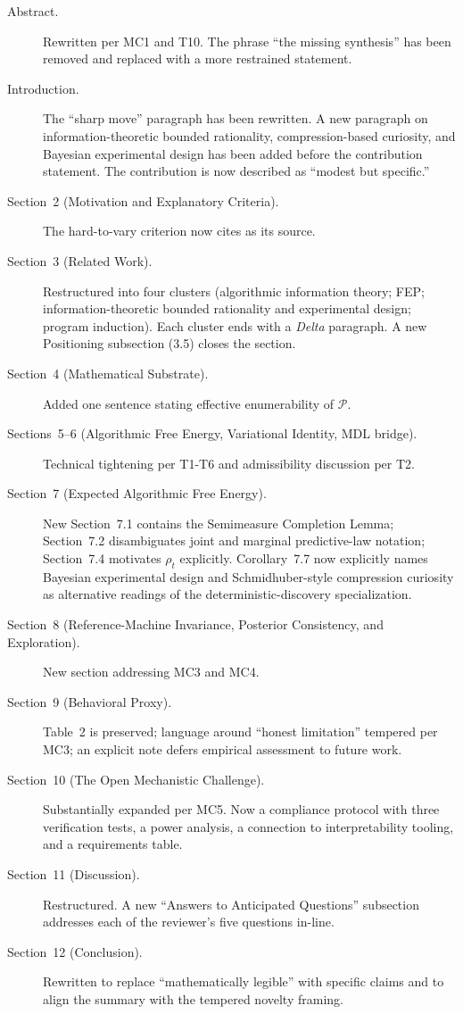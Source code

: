 \documentclass[11pt]{article}
\begin{document}
\begin{description}
\item[Abstract.] Rewritten per MC1 and T10. The phrase ``the missing synthesis'' has been removed and replaced with a more restrained statement.
\item[Introduction.] The ``sharp move'' paragraph has been rewritten. A new paragraph on information-theoretic bounded rationality, compression-based curiosity, and Bayesian experimental design has been added before the contribution statement. The contribution is now described as ``modest but specific.''
\item[Section~2 (Motivation and Explanatory Criteria).] The hard-to-vary criterion now cites \citet{Deutsch2011} as its source.
\item[Section~3 (Related Work).] Restructured into four clusters (algorithmic information theory; FEP; information-theoretic bounded rationality and experimental design; program induction). Each cluster ends with a \emph{Delta} paragraph. A new Positioning subsection (3.5) closes the section.
\item[Section~4 (Mathematical Substrate).] Added one sentence stating effective enumerability of $\mathcal{P}$.
\item[Sections~5--6 (Algorithmic Free Energy, Variational Identity, MDL bridge).] Technical tightening per T1-T6 and admissibility discussion per T2.
\item[Section~7 (Expected Algorithmic Free Energy).] New Section~7.1 contains the Semimeasure Completion Lemma; Section~7.2 disambiguates joint and marginal predictive-law notation; Section~7.4 motivates $\rho_t$ explicitly. Corollary~7.7 now explicitly names Bayesian experimental design and Schmidhuber-style compression curiosity as alternative readings of the deterministic-discovery specialization.
\item[Section~8 (Reference-Machine Invariance, Posterior Consistency, and Exploration).] New section addressing MC3 and MC4.
\item[Section~9 (Behavioral Proxy).] Table~2 is preserved; language around ``honest limitation'' tempered per MC3; an explicit note defers empirical assessment to future work.
\item[Section~10 (The Open Mechanistic Challenge).] Substantially expanded per MC5. Now a compliance protocol with three verification tests, a power analysis, a connection to interpretability tooling, and a requirements table.
\item[Section~11 (Discussion).] Restructured. A new ``Answers to Anticipated Questions'' subsection addresses each of the reviewer's five questions in-line.
\item[Section~12 (Conclusion).] Rewritten to replace ``mathematically legible'' with specific claims and to align the summary with the tempered novelty framing.
\end{description}
\end{document}
